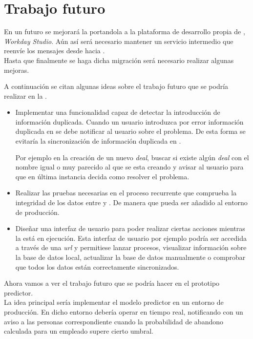 \chapter{Trabajo futuro}

En un futuro se mejorará la \iface{} portandola a la plataforma de desarrollo propia de \wday{}, \textit{Workday Studio}. Aún así será necesario mantener un servicio intermedio que reenvíe los mensajes desde \hs{} hacia \wday{}.\\

Hasta que finalmente se haga dicha migración será necesario realizar algunas mejoras.

A continuación se citan algunas ideas sobre el trabajo futuro que se podría realizar en la \iface{}.
\begin{itemize}
	\item Implementar una funcionalidad capaz de detectar la introducción de información duplicada. Cuando un usuario introduzca por error información duplicada en \hs{} se debe notificar al usuario sobre el problema. De esta forma se evitaría la sincronización de información duplicada en \wday{}.
	
	Por ejemplo en la creación de un nuevo \textit{deal}, buscar si existe algún \textit{deal} con el nombre igual o muy parecido al que se esta creando y avisar al usuario para que en última instancia decida como resolver el problema.
	
	\item Realizar las pruebas necesarias en el proceso recurrente que comprueba la integridad de los datos entre \hs{} y \wday{}. De manera que pueda ser añadido al entorno de producción.
	
	\item Diseñar una interfaz de usuario para poder realizar ciertas acciones mientras la \iface{} está en ejecución. Esta interfaz de usuario por ejemplo podría ser accedida a través de una \textit{url} y permitiese lanzar procesos, visualizar información sobre la base de datos local, actualizar la base de datos manualmente o comprobar que todos los datos están correctamente sincronizados.
	
	
\end{itemize}


Ahora vamos a ver el trabajo futuro que se podría hacer en el prototipo predictor.\\

La idea principal sería implementar el modelo predictor en un entorno de producción. En dicho entorno debería operar en tiempo real, notificando con un aviso a las personas correspondiente cuando la probabilidad de abandono calculada para un empleado supere cierto umbral.

